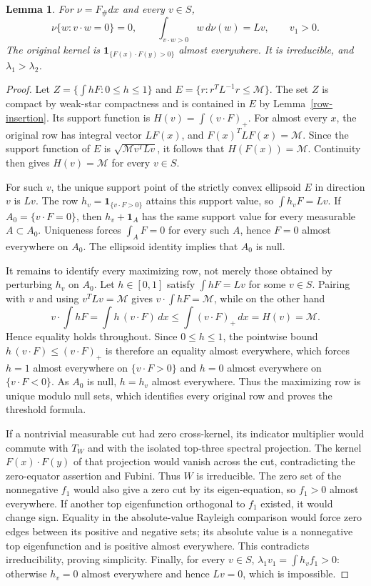 \documentclass[11pt]{article}
\newtheorem{lemma}[theorem]{Lemma}
\theoremstyle{remark}\newtheorem{remark}[theorem]{Remark}
\numberwithin{equation}{section}
\begin{document}
\begin{lemma}\label{contact-structure}
For $\nu=F_\#dx$ and every $v\in S$,
\begin{equation}\label{all-rows}
 \nu\{w:v\cdot w=0\}=0,\qquad
 \int_{v\cdot w>0}w\,d\nu(w)=Lv,\qquad v_1>0.
\end{equation}
The original kernel is $\mathbf1_{\{F(x)\cdot F(y)>0\}}$ almost
everywhere. It is irreducible, and $\lambda_1>\lambda_2$.
\end{lemma}
\begin{proof}
Let $Z=\{\int hF:0\le h\le1\}$ and
$E=\{r:r^TL^{-1}r\le\mathcal M\}$. The set $Z$ is compact by weak-star
compactness and is contained in $E$ by Lemma~\ref{row-insertion}.
Its support function is $H(v)=\int(v\cdot F)_+$.
For almost every $x$, the original row has integral vector $LF(x)$,
and $F(x)^TLF(x)=\mathcal M$. Since the support function of $E$ is
$\sqrt{\mathcal M v^TLv}$, it follows that $H(F(x))=\mathcal M$.
Continuity then gives $H(v)=\mathcal M$ for every $v\in S$.

For such $v$, the unique support point of the strictly convex ellipsoid
$E$ in direction $v$ is $Lv$. The row $h_v=\mathbf1_{\{v\cdot F>0\}}$
attains this support value, so $\int h_vF=Lv$. If
$A_0=\{v\cdot F=0\}$, then $h_v+\mathbf1_A$ has the same support value
for every measurable $A\subset A_0$. Uniqueness forces $\int_A F=0$
for every such $A$, hence $F=0$ almost everywhere on $A_0$.
The ellipsoid identity implies that $A_0$ is null.

It remains to identify every maximizing row, not merely those obtained by
perturbing $h_v$ on $A_0$. Let $h\in[0,1]$ satisfy $\int hF=Lv$ for some
$v\in S$. Pairing with $v$ and using $v^TLv=\mathcal M$ gives
$v\cdot\int hF=\mathcal M$, while on the other hand
\[
 v\cdot\int hF=\int h\,(v\cdot F)\,dx\le\int(v\cdot F)_+\,dx=H(v)=\mathcal M .
\]
Hence equality holds throughout. Since $0\le h\le1$, the pointwise bound
$h\,(v\cdot F)\le(v\cdot F)_+$ is therefore an equality almost everywhere,
which forces $h=1$ almost everywhere on $\{v\cdot F>0\}$ and $h=0$ almost
everywhere on $\{v\cdot F<0\}$. As $A_0$ is null, $h=h_v$ almost
everywhere. Thus the maximizing row is unique modulo null sets, which
identifies every original row and proves the threshold formula.

If a nontrivial measurable cut had zero cross-kernel, its indicator
multiplier would commute with $T_W$ and with the isolated top-three
spectral projection. The kernel $F(x)\cdot F(y)$ of that projection
would vanish across the cut, contradicting the zero-equator assertion
and Fubini. Thus $W$ is irreducible. The zero set of the nonnegative
$f_1$ would also give a zero cut by its eigen-equation, so $f_1>0$ almost
everywhere. If another top eigenfunction orthogonal to $f_1$ existed,
it would change sign. Equality in the absolute-value Rayleigh comparison
would force zero edges between its positive and negative sets; its
absolute value is a nonnegative top eigenfunction and is positive almost
everywhere. This contradicts irreducibility, proving simplicity.
Finally, for every $v\in S$, $\lambda_1v_1=\int h_vf_1>0$:
otherwise $h_v=0$ almost everywhere and hence $Lv=0$, which is impossible.
\end{proof}
\end{document}
